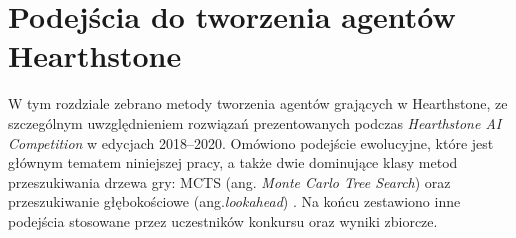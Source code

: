 \chapter{Podejścia do tworzenia agentów Hearthstone} \label{chap:sota}

W tym rozdziale zebrano metody tworzenia agentów grających w Hearthstone, ze szczególnym uwzględnieniem rozwiązań prezentowanych podczas \textit{Hearthstone AI Competition} w edycjach 2018--2020. Omówiono podejście ewolucyjne, które jest głównym tematem niniejszej pracy, a także dwie dominujące klasy metod przeszukiwania drzewa gry: MCTS (ang. \textit{Monte Carlo Tree Search}) oraz przeszukiwanie głębokościowe (ang.\textit{lookahead}) \cite{hearthstone_competition}. Na końcu zestawiono inne podejścia stosowane przez uczestników konkursu oraz wyniki zbiorcze.








